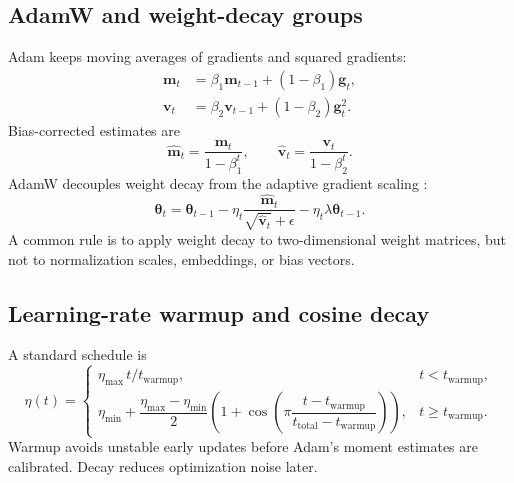 \documentclass[11pt,a4paper]{article}
\theoremstyle{definition}
\theoremstyle{plain}
\newcommand{\vtheta}{\bm{\theta}}
\begin{document}
\subsection{AdamW and weight-decay groups}

Adam keeps moving averages of gradients and squared gradients:
\begin{align}
    \bm m_t&=\beta_1\bm m_{t-1}+(1-\beta_1)\bm g_t,\\
    \bm v_t&=\beta_2\bm v_{t-1}+(1-\beta_2)\bm g_t^2.
\end{align}
Bias-corrected estimates are
\begin{equation}
    \widehat{\bm m}_t=\frac{\bm m_t}{1-\beta_1^t},
    \qquad
    \widehat{\bm v}_t=\frac{\bm v_t}{1-\beta_2^t}.
\end{equation}
AdamW decouples weight decay from the adaptive gradient scaling \cite{loshchilov2019adamw}:
\begin{equation}\label{eq:adamw}
    \vtheta_t=\vtheta_{t-1}
    -\eta_t\frac{\widehat{\bm m}_t}{\sqrt{\widehat{\bm v}_t}+\epsilon}
    -\eta_t\lambda\vtheta_{t-1}.
\end{equation}
A common rule is to apply weight decay to two-dimensional weight matrices, but not to normalization scales, embeddings, or bias vectors.

\subsection{Learning-rate warmup and cosine decay}

A standard schedule is
\begin{equation}\label{eq:cosine_schedule}
    \eta(t)=\begin{cases}
        \eta_{\max}\,t/t_{\mathrm{warmup}}, & t<t_{\mathrm{warmup}},\\[0.5em]
        \eta_{\min}+\dfrac{\eta_{\max}-\eta_{\min}}{2}
        \left(1+\cos\left(\pi\dfrac{t-t_{\mathrm{warmup}}}{t_{\mathrm{total}}-t_{\mathrm{warmup}}}\right)\right), & t\geq t_{\mathrm{warmup}}.
    \end{cases}
\end{equation}
Warmup avoids unstable early updates before Adam's moment estimates are calibrated. Decay reduces optimization noise later.
\end{document}
